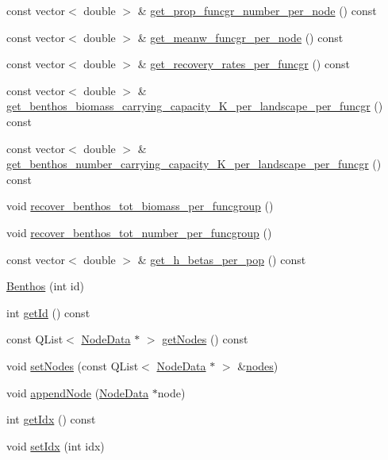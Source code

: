 \begin{DoxyCompactItemize}
const vector$<$ double $>$ \& \mbox{\hyperlink{class_benthos_a7f8007882d4f950f6037e5fb57a316af}{get\+\_\+prop\+\_\+funcgr\+\_\+number\+\_\+per\+\_\+node}} () const
\item 
const vector$<$ double $>$ \& \mbox{\hyperlink{class_benthos_aded64c31ec08e3c09673970ecb23697b}{get\+\_\+meanw\+\_\+funcgr\+\_\+per\+\_\+node}} () const
\item 
const vector$<$ double $>$ \& \mbox{\hyperlink{class_benthos_ac04ce2803897d9f3f6ab54ba14a88124}{get\+\_\+recovery\+\_\+rates\+\_\+per\+\_\+funcgr}} () const
\item 
const vector$<$ double $>$ \& \mbox{\hyperlink{class_benthos_afa2fc8a56fc192d4451448a4c619b9d5}{get\+\_\+benthos\+\_\+biomass\+\_\+carrying\+\_\+capacity\+\_\+\+K\+\_\+per\+\_\+landscape\+\_\+per\+\_\+funcgr}} () const
\item 
const vector$<$ double $>$ \& \mbox{\hyperlink{class_benthos_a81cc29213885d1d3a1b7b754bde8631d}{get\+\_\+benthos\+\_\+number\+\_\+carrying\+\_\+capacity\+\_\+\+K\+\_\+per\+\_\+landscape\+\_\+per\+\_\+funcgr}} () const
\item 
void \mbox{\hyperlink{class_benthos_a7652f786e6ca8209c755c64c5482ee56}{recover\+\_\+benthos\+\_\+tot\+\_\+biomass\+\_\+per\+\_\+funcgroup}} ()
\item 
void \mbox{\hyperlink{class_benthos_af3d98be2f4b763a1bbbd96b6bf9b9f6d}{recover\+\_\+benthos\+\_\+tot\+\_\+number\+\_\+per\+\_\+funcgroup}} ()
\item 
const vector$<$ double $>$ \& \mbox{\hyperlink{class_benthos_ae659a0c8e7de285446a63c6a15fd0321}{get\+\_\+h\+\_\+betas\+\_\+per\+\_\+pop}} () const
\item 
\mbox{\hyperlink{class_benthos_a7b0ab728546fbbc4075f920d05eedd69}{Benthos}} (int id)
\item 
int \mbox{\hyperlink{class_benthos_a5aa8261a598fdaab9d85bc4922e1c073}{get\+Id}} () const
\item 
const Q\+List$<$ \mbox{\hyperlink{class_node_data}{Node\+Data}} $\ast$ $>$ \mbox{\hyperlink{class_benthos_af9e82bc7dc4f64a6f7542b8c133036bf}{get\+Nodes}} () const
\item 
void \mbox{\hyperlink{class_benthos_a808d6b54f6bb55dd1ec201e67a582968}{set\+Nodes}} (const Q\+List$<$ \mbox{\hyperlink{class_node_data}{Node\+Data}} $\ast$ $>$ \&\mbox{\hyperlink{thread__vessels_8cpp_ace5675146c8515428d094fd142d8a2d2}{nodes}})
\item 
void \mbox{\hyperlink{class_benthos_ab700a035260220d5da905d78b8ac083e}{append\+Node}} (\mbox{\hyperlink{class_node_data}{Node\+Data}} $\ast$node)
\item 
int \mbox{\hyperlink{class_benthos_a0d382b6cf7ad6069b0841b1b13256639}{get\+Idx}} () const
\item 
void \mbox{\hyperlink{class_benthos_ab7cc01304c1a22b2cdbce3fbf75f5258}{set\+Idx}} (int idx)
\end{DoxyCompactItemize}


